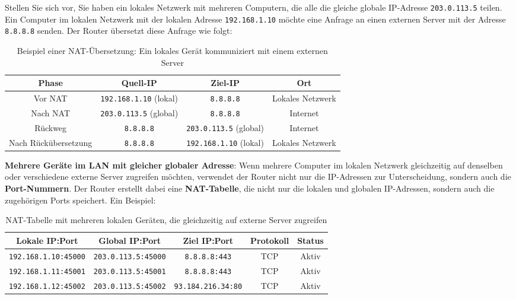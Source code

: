 \begin{myexample}
Stellen Sie sich vor, Sie haben ein lokales Netzwerk mit mehreren Computern, die alle die gleiche globale \gls{IP}-Adresse \texttt{203.0.113.5} teilen. Ein Computer im lokalen Netzwerk mit der lokalen Adresse \texttt{192.168.1.10} möchte eine Anfrage an einen externen Server mit der Adresse \texttt{8.8.8.8} senden. Der Router übersetzt diese Anfrage wie folgt:

\begin{table}[H]
	\centering
	\begin{tabular}{c|c|c|c}
		\textbf{Phase} & \textbf{Quell-IP} & \textbf{Ziel-IP} & \textbf{Ort} \\
		\midrule\midrule
		Vor \gls{NAT} & \texttt{192.168.1.10} (lokal) & \texttt{8.8.8.8} & Lokales Netzwerk \\
		\midrule
		Nach \gls{NAT} & \texttt{203.0.113.5} (global) & \texttt{8.8.8.8} & Internet \\
		\midrule
		Rückweg & \texttt{8.8.8.8} & \texttt{203.0.113.5} (global) & Internet \\
		\midrule
		Nach Rückübersetzung & \texttt{8.8.8.8} & \texttt{192.168.1.10} (lokal) & Lokales Netzwerk \\
	\end{tabular}
	\caption{Beispiel einer \gls{NAT}-Übersetzung: Ein lokales Gerät kommuniziert mit einem externen Server}
\end{table}

\textbf{Mehrere Geräte im \gls{LAN} mit gleicher globaler Adresse}: Wenn mehrere Computer im lokalen Netzwerk gleichzeitig auf denselben oder verschiedene externe Server zugreifen möchten, verwendet der Router nicht nur die \gls{IP}-Adressen zur Unterscheidung, sondern auch die \textbf{Port-Nummern}. Der Router erstellt dabei eine \textbf{\gls{NAT}-Tabelle}, die nicht nur die lokalen und globalen \gls{IP}-Adressen, sondern auch die zugehörigen Ports speichert. Ein Beispiel:

\begin{table}[H]
	\centering
	\begin{tabular}{c|c|c|c|c}
		\textbf{Lokale IP:Port} & \textbf{Global IP:Port} & \textbf{Ziel IP:Port} & \textbf{Protokoll} & \textbf{Status} \\
		\midrule\midrule
		\texttt{192.168.1.10:45000} & \texttt{203.0.113.5:45000} & \texttt{8.8.8.8:443} & \gls{TCP} & Aktiv \\
		\midrule
		\texttt{192.168.1.11:45001} & \texttt{203.0.113.5:45001} & \texttt{8.8.8.8:443} & \gls{TCP} & Aktiv \\
		\midrule
		\texttt{192.168.1.12:45002} & \texttt{203.0.113.5:45002} & \texttt{93.184.216.34:80} & \gls{TCP} & Aktiv \\
	\end{tabular}
	\caption{\gls{NAT}-Tabelle mit mehreren lokalen Geräten, die gleichzeitig auf externe Server zugreifen}
\end{table}


\end{myexample}
